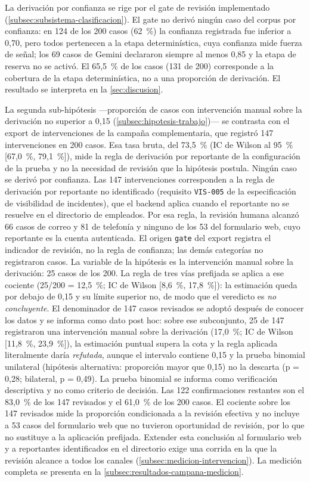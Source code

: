 La derivación por confianza se rige por el gate de revisión implementado (\autoref{subsec:subsistema-clasificacion}). El gate no derivó ningún caso del corpus por confianza: en 124 de los 200 casos (62~\%) la confianza registrada fue inferior a 0,70, pero todos pertenecen a la etapa determinística, cuya confianza mide fuerza de señal; los 69 casos de Gemini declararon siempre al menos 0,85 y la etapa de reserva no se activó. El 65,5~\% de los casos (131 de 200) corresponde a la cobertura de la etapa determinística, no a una proporción de derivación. El resultado se interpreta en la \autoref{sec:discusion}.

La segunda sub-hipótesis ---proporción de casos con intervención manual sobre la derivación no superior a 0,15 (\autoref{subsec:hipotesis-trabajo})--- se contrasta con el export de intervenciones de la campaña complementaria, que registró 147 intervenciones en 200 casos. Esa tasa bruta, del 73,5~\% (IC de Wilson al 95~\% [67,0~\%, 79,1~\%]), mide la regla de derivación por reportante de la configuración de la prueba y no la necesidad de revisión que la hipótesis postula. Ningún caso se derivó por confianza. Las 147 intervenciones corresponden a la regla de derivación por reportante no identificado (requisito \texttt{VIS-005} de la especificación de visibilidad de incidentes), que el backend aplica cuando el reportante no se resuelve en el directorio de empleados. Por esa regla, la revisión humana alcanzó 66 casos de correo y 81 de telefonía y ninguno de los 53 del formulario web, cuyo reportante es la cuenta autenticada. El origen \texttt{gate} del export registra el indicador de revisión, no la regla de confianza; las demás categorías no registraron casos. La variable de la hipótesis es la intervención manual sobre la derivación: 25 casos de los 200. La regla de tres vías prefijada se aplica a ese cociente (25/200 = 12,5~\%; IC de Wilson [8,6~\%, 17,8~\%]): la estimación queda por debajo de 0,15 y su límite superior no, de modo que el veredicto es \emph{no concluyente}. El denominador de 147 casos revisados se adoptó después de conocer los datos y se informa como dato post hoc: sobre ese subconjunto, 25 de 147 registraron una intervención manual sobre la derivación (17,0~\%; IC de Wilson [11,8~\%, 23,9~\%]), la estimación puntual supera la cota y la regla aplicada literalmente daría \emph{refutada}, aunque el intervalo contiene 0,15 y la prueba binomial unilateral (hipótesis alternativa: proporción mayor que 0,15) no la descarta (p = 0,28; bilateral, p = 0,49). La prueba binomial se informa como verificación descriptiva y no como criterio de decisión. Las 122 confirmaciones restantes son el 83,0~\% de los 147 revisados y el 61,0~\% de los 200 casos. El cociente sobre los 147 revisados mide la proporción condicionada a la revisión efectiva y no incluye a 53 casos del formulario web que no tuvieron oportunidad de revisión, por lo que no sustituye a la aplicación prefijada. Extender esta conclusión al formulario web y a reportantes identificados en el directorio exige una corrida en la que la revisión alcance a todos los canales (\autoref{subsec:medicion-intervencion}). La medición completa se presenta en la \autoref{subsec:resultados-campana-medicion}.

